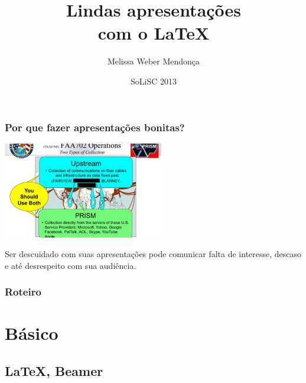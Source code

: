 \documentclass{beamer}
\title{Lindas apresentações\\ com o \LaTeX}
\author{Melissa Weber Mendonça}
\date{SoLiSC 2013}
\begin{document}
{%
\begin{frame}%
   \titlepage%
\end{frame}%
}

\begin{frame}
   \frametitle{Por que fazer apresentações bonitas?}
   \begin{center}
      \includegraphics[width=7cm]{imagens/prism.jpeg}
   \end{center}
   Ser descuidado com suas apresentações pode comunicar falta de interesse, descaso e até \alert{desrespeito} com sua audiência.
\end{frame}

\begin{frame}
   \frametitle{Roteiro}
   \tableofcontents[pausesections]
\end{frame}

\section{Básico}

\subsection{\LaTeX, Beamer}
\end{document}
